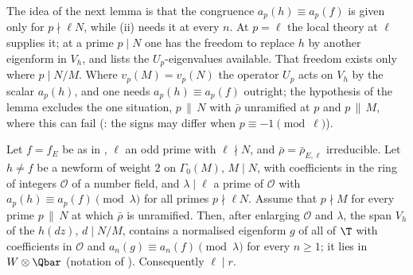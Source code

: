 The idea of the next lemma is that the congruence $a_p(h)\equiv a_p(f)$ is given only for $p\nmid\ell N$, while (ii) needs it at every $n$. At $p=\ell$ the
local theory at $\ell$ supplies it; at a prime $p\mid N$ one has the freedom to replace $h$ by another eigenform in $V_h$, and  lists the
$U_p$-eigenvalues available. That freedom exists only where $p\mid N/M$. Where $v_p(M)=v_p(N)$ the operator $U_p$ acts on $V_h$ by the scalar $a_p(h)$, and one needs
$a_p(h)\equiv a_p(f)$ outright; the hypothesis of the lemma excludes the one situation, $p\,\|\,N$ with $\bar\rho$ unramified at $p$ and $p\,\|\,M$, where this can fail
(: the signs may differ when $p\equiv-1\pmod\ell$).

\begin{lemma}\label{lem:modgalrep:old}
Let $f=f_E$ be as in , $\ell$ an odd prime with $\ell\nmid N$, and $\bar\rho=\bar\rho_{E,\ell}$ irreducible. Let $h\ne f$ be a newform of weight $2$
on $\Gamma_0(M)$, $M\mid N$, with coefficients in the ring of integers $\mathcal{O}$ of a number field, and $\lambda\mid\ell$ a prime of $\mathcal{O}$ with $a_p(h)\equiv a_p(f)\pmod\lambda$ for all
primes $p\nmid\ell N$. Assume that $p\nmid M$ for every prime $p\,\|\,N$ at which $\bar\rho$ is unramified. Then, after enlarging $\mathcal{O}$ and $\lambda$, the span $V_h$ of the $h(dz)$,
$d\mid N/M$, contains a normalised eigenform $g$ of all of $\T$ with coefficients in $\mathcal{O}$ and $a_n(g)\equiv a_n(f)\pmod\lambda$ for every $n\ge1$; it lies in $W\otimes\Qbar$
(notation of ).
Consequently $\ell\mid r$.
\end{lemma}

